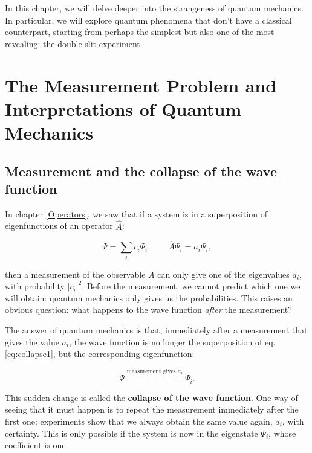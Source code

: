 \documentclass[
  english,
  9pt,
]{extbook}
\theoremstyle{definition}
\theoremstyle{definition}
\theoremstyle{definition}
\theoremstyle{definition}
\theoremstyle{remark}
\begin{document}
In this chapter, we will delve deeper into the strangeness of quantum mechanics. In particular, we will explore quantum phenomena that don't have a classical counterpart, starting from perhaps the simplest but also one of the most revealing: the double-slit experiment.

\section{The Measurement Problem and Interpretations of Quantum Mechanics}\label{the-measurement-problem-and-interpretations-of-quantum-mechanics}

\subsection{Measurement and the collapse of the wave function}\label{measurement-and-the-collapse-of-the-wave-function}

In chapter \ref{Operators}, we saw that if a system is in a superposition of eigenfunctions of an operator \(\hat{A}\):

\begin{equation}
\Psi = \sum_i c_i \Psi_i, \qquad \hat{A}\Psi_i = a_i\Psi_i,
\label{eq:collapse1}
\end{equation}

then a measurement of the observable \(A\) can only give one of the eigenvalues \(a_i\), with probability \(|c_i|^2\). Before the measurement, we cannot predict which one we will obtain: quantum mechanics only gives us the probabilities. This raises an obvious question: what happens to the wave function \emph{after} the measurement?

The answer of quantum mechanics is that, immediately after a measurement that gives the value \(a_i\), the wave function is no longer the superposition of eq. \eqref{eq:collapse1}, but the corresponding eigenfunction:

\begin{equation}
\Psi \xrightarrow{\text{measurement gives } a_i} \Psi_i.
\label{eq:collapse2}
\end{equation}

This sudden change is called the \textbf{collapse of the wave function}. One way of seeing that it must happen is to repeat the measurement immediately after the first one: experiments show that we always obtain the same value again, \(a_i\), with certainty. This is only possible if the system is now in the eigenstate \(\Psi_i\), whose coefficient is one.
\end{document}
